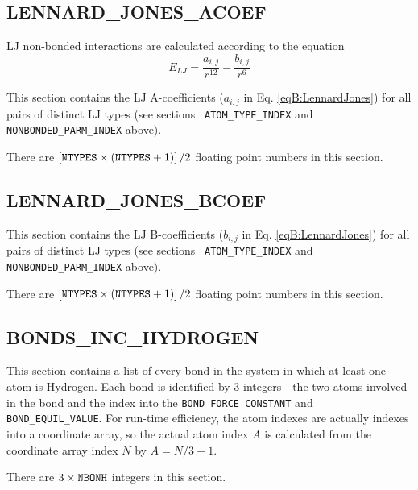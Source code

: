 \subsection*{LENNARD\_JONES\_ACOEF}

LJ non-bonded interactions are calculated according to the equation
\begin{equation}
   E_{LJ} = \frac {a_{i,j}} {r ^ {12}} - \frac {b_{i,j}} {r ^ 6}
   \label{eqB:LennardJones}
\end{equation}

This section contains the LJ A-coefficients ($a_{i,j}$ in Eq.
\ref{eqB:LennardJones}) for all pairs of distinct LJ types (see sections {\tt
ATOM\_TYPE\_INDEX} and {\tt NONBONDED\_PARM\_INDEX} above).


\noindent There are $\left [ {\tt NTYPES} \times ( {\tt NTYPES} + 1 ) \right ] /
2$ floating point numbers in this section.

\subsection*{LENNARD\_JONES\_BCOEF}

This section contains the LJ B-coefficients ($b_{i,j}$ in Eq.
\ref{eqB:LennardJones}) for all pairs of distinct LJ types (see sections {\tt
ATOM\_TYPE\_INDEX} and {\tt NONBONDED\_PARM\_INDEX} above).


\noindent There are $\left [ {\tt NTYPES} \times ( {\tt NTYPES} + 1 ) \right ] /
2$ floating point numbers in this section.

\subsection*{BONDS\_INC\_HYDROGEN}

This section contains a list of every bond in the system in which at least one
atom is Hydrogen. Each bond is identified by 3 integers---the two atoms involved
in the bond and the index into the {\tt BOND\_FORCE\_CONSTANT} and {\tt
BOND\_EQUIL\_VALUE}. For run-time efficiency, the atom indexes are actually
indexes into a coordinate array, so the actual atom index $A$ is calculated from
the coordinate array index $N$ by $A = N / 3 + 1$.


\noindent There are $3 \times {\tt NBONH}$ integers in this section.

